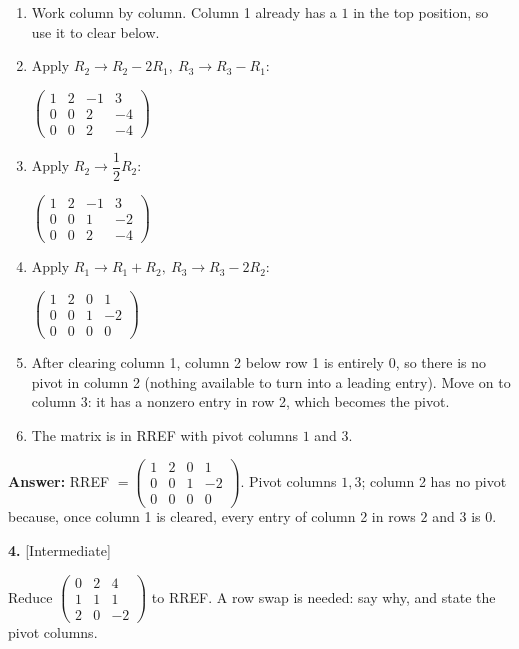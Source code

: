 \documentclass[11pt]{article}
\begin{document}
\begin{tcolorbox}[breakable,colback=ans,colframe=ansb,boxrule=0.5pt,left=4pt,right=4pt,top=2pt,bottom=2pt]\begin{enumerate}[leftmargin=2.2em,itemsep=1pt,topsep=1pt,label=\textbf{Step \arabic*.}]\item Work column by column. Column 1 already has a $1$ in the top position, so use it to clear below.
\item Apply $R_2\to R_2-2R_1,\ R_3\to R_3-R_1$:\par\smallskip $\displaystyle \begin{pmatrix}1 & 2 & -1 & 3 \\ 0 & 0 & 2 & -4 \\ 0 & 0 & 2 & -4\end{pmatrix}$
\item Apply $R_2\to \dfrac{1}{2} R_2$:\par\smallskip $\displaystyle \begin{pmatrix}1 & 2 & -1 & 3 \\ 0 & 0 & 1 & -2 \\ 0 & 0 & 2 & -4\end{pmatrix}$
\item Apply $R_1\to R_1+R_2,\ R_3\to R_3-2R_2$:\par\smallskip $\displaystyle \begin{pmatrix}1 & 2 & 0 & 1 \\ 0 & 0 & 1 & -2 \\ 0 & 0 & 0 & 0\end{pmatrix}$
\item After clearing column 1, column 2 below row 1 is entirely $0$, so there is no pivot in column 2 (nothing available to turn into a leading entry). Move on to column 3: it has a nonzero entry in row 2, which becomes the pivot.
\item The matrix is in RREF with pivot columns $1$ and $3$.
\end{enumerate}\textbf{Answer:} RREF $=\begin{pmatrix}1 & 2 & 0 & 1 \\ 0 & 0 & 1 & -2 \\ 0 & 0 & 0 & 0\end{pmatrix}$. Pivot columns $1,3$; column 2 has no pivot because, once column 1 is cleared, every entry of column 2 in rows $2$ and $3$ is $0$.\end{tcolorbox}
\par\vspace{2pt}
\begin{minipage}{\linewidth}\textbf{4.} \hfill{\scriptsize\color{ink}[Intermediate]}\par\nopagebreak Reduce $\begin{pmatrix}0 & 2 & 4 \\ 1 & 1 & 1 \\ 2 & 0 & -2\end{pmatrix}$ to RREF. A row swap is needed: say why, and state the pivot columns.
\end{minipage}\par\nopagebreak
\end{document}
